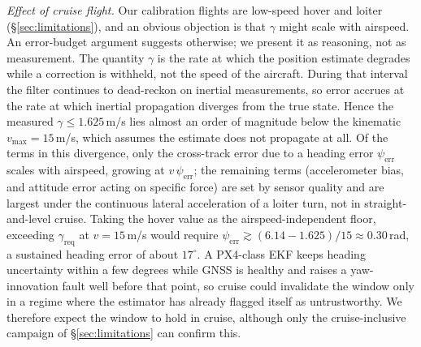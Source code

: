 \emph{Effect of cruise flight.} Our calibration flights are low-speed hover
and loiter (\S\ref{sec:limitations}), and an obvious objection is
that $\gamma$ might scale with airspeed. An error-budget argument suggests
otherwise; we present it as reasoning, not as measurement. The quantity
$\gamma$ is the rate at which the position estimate degrades while a correction
is withheld, not the speed of the aircraft. During that interval the filter
continues to dead-reckon on inertial measurements, so error accrues at the rate
at which inertial propagation diverges from the true state. Hence the
measured $\gamma\le1.625$\,m/s lies almost an order of magnitude below the
kinematic $v_{\max}=15$\,m/s, which assumes the estimate does not propagate
at all. Of the terms in this divergence, only the cross-track error due to a
heading error $\psi_{\mathrm{err}}$ scales with airspeed, growing at
$v\,\psi_{\mathrm{err}}$; the remaining terms (accelerometer bias,
and attitude error acting on specific force) are set by sensor quality and are
largest under the continuous lateral acceleration of a loiter turn, not in
straight-and-level cruise. Taking the hover value as the airspeed-independent
floor, exceeding $\gamma_{\mathrm{req}}$ at $v=15$\,m/s would require
$\psi_{\mathrm{err}}\gtrsim(6.14-1.625)/15\approx0.30$\,rad, a sustained heading
error of about $17^\circ$. A PX4-class EKF keeps heading uncertainty within a
few degrees while GNSS is healthy and raises a yaw-innovation fault well before
that point, so cruise could invalidate the window only in a regime where the
estimator has already flagged itself as untrustworthy. We therefore expect the
window to hold in cruise, although only the cruise-inclusive campaign of
\S\ref{sec:limitations} can confirm this.


